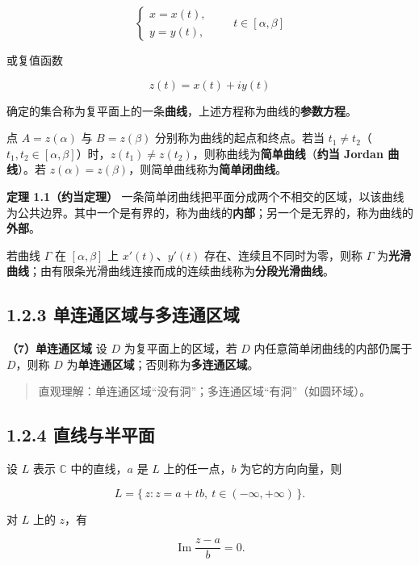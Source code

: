 \[
\begin{cases}
x = x(t),\\
y = y(t),
\end{cases}
\qquad t\in[\alpha,\beta]
\]

或复值函数

\[
z(t) = x(t)+iy(t)
\]

确定的集合称为复平面上的一条\textbf{曲线}，上述方程称为曲线的\textbf{参数方程}。

点 \(A=z(\alpha)\) 与 \(B=z(\beta)\) 分别称为曲线的起点和终点。若当
\(t_1\neq t_2\)（\(t_1,t_2\in[\alpha,\beta]\)）时，\(z(t_1)\neq z(t_2)\)，则称曲线为\textbf{简单曲线}（\textbf{约当
Jordan 曲线}）。若
\(z(\alpha)=z(\beta)\)，则简单曲线称为\textbf{简单闭曲线}。

\textbf{定理 1.1（约当定理）}
一条简单闭曲线把平面分成两个不相交的区域，以该曲线为公共边界。其中一个是有界的，称为曲线的\textbf{内部}；另一个是无界的，称为曲线的\textbf{外部}。

若曲线 \(\Gamma\) 在 \([\alpha,\beta]\) 上 \(x'(t)\)、\(y'(t)\)
存在、连续且不同时为零，则称 \(\Gamma\)
为\textbf{光滑曲线}；由有限条光滑曲线连接而成的连续曲线称为\textbf{分段光滑曲线}。

\subsection{1.2.3
单连通区域与多连通区域}\label{ux5355ux8fdeux901aux533aux57dfux4e0eux591aux8fdeux901aux533aux57df}

\textbf{（7）单连通区域} 设 \(D\) 为复平面上的区域，若 \(D\)
内任意简单闭曲线的内部仍属于 \(D\)，则称 \(D\)
为\textbf{单连通区域}；否则称为\textbf{多连通区域}。

\begin{quote}
直观理解：单连通区域``没有洞''；多连通区域``有洞''（如圆环域）。
\end{quote}

\subsection{1.2.4
直线与半平面}\label{ux76f4ux7ebfux4e0eux534aux5e73ux9762}

设 \(L\) 表示 \(\mathbb{C}\) 中的直线，\(a\) 是 \(L\) 上的任一点，\(b\)
为它的方向向量，则

\[
L = \{\, z : z = a+tb,\ t\in(-\infty,+\infty)\,\}.
\]

对 \(L\) 上的 \(z\)，有

\[
\operatorname{Im}\frac{z-a}{b} = 0 .
\]

